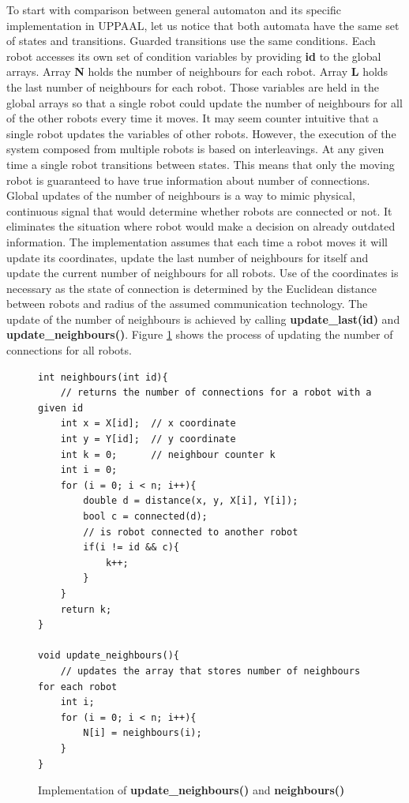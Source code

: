 To start with comparison between general automaton and its specific implementation in UPPAAL, let us notice that both automata have the same set of states and transitions. Guarded transitions use the same conditions. Each robot accesses its own set of condition variables by providing \textbf{id} to the global arrays. Array \textbf{N} holds the number of neighbours for each robot. Array \textbf{L} holds the last number of neighbours for each robot. Those variables are held in the global arrays so that a single robot could update the number of neighbours for all of the other robots every time it moves. It may seem counter intuitive that a single robot updates the variables of other robots. However, the execution of the system composed from multiple robots is based on interleavings. At any given time a single robot transitions between states. This means that only the moving robot is guaranteed to have true information about number of connections. Global updates of the number of neighbours is a way to mimic physical, continuous signal that would determine whether robots are connected or not. It eliminates the situation where robot would make a decision on already outdated information. The implementation assumes that each time a robot moves it will update its coordinates, update the last number of neighbours for itself and update the current number of neighbours for all robots. Use of the coordinates is necessary as the state of connection is determined by the Euclidean distance between robots and radius of the assumed communication technology. The update of the number of neighbours is achieved by calling \textbf{update\_last(id)} and \textbf{update\_neighbours()}. Figure \ref{fig:neighbours} shows the process of updating the number of connections for all robots.

\begin{figure}[H]
\caption{Implementation of \textbf{update\_neighbours()} and \textbf{neighbours()}}
\lstset { language=C++ }
\begin{lstlisting}
int neighbours(int id){
    // returns the number of connections for a robot with a given id
    int x = X[id];  // x coordinate
    int y = Y[id];  // y coordinate
    int k = 0;      // neighbour counter k
    int i = 0;   
    for (i = 0; i < n; i++){
        double d = distance(x, y, X[i], Y[i]);
        bool c = connected(d);
        // is robot connected to another robot
        if(i != id && c){
            k++;
        }
    }
    return k;
}

void update_neighbours(){
    // updates the array that stores number of neighbours for each robot
    int i;
    for (i = 0; i < n; i++){
        N[i] = neighbours(i);
    }
}
\end{lstlisting}
\label{fig:neighbours}
\end{figure}

